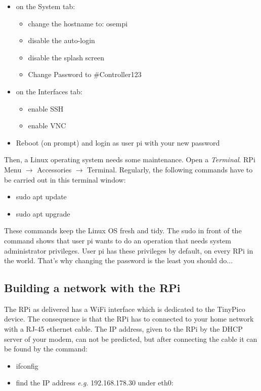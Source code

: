 \begin{itemize}
	\item on the \textsf{System} tab:
	\begin{itemize}
		\item change the hostname to: \textsf{osempi}
		\item disable the auto-login
		\item disable the splash screen
		\item Change Password to \textsf{\#Controller123}
	\end{itemize}
	\item on the \textsf{Interfaces} tab:
		\begin{itemize}
		\item enable SSH
		\item enable VNC
	\end{itemize}
    \item Reboot (on prompt) and login as user \textsf{pi} with your new password
\end{itemize}

Then, a Linux operating system needs some maintenance. Open a \textit{Terminal}. \textsf{RPi Menu $\rightarrow$ Accessories $\rightarrow$ Terminal}. Regularly, the following commands have to be carried out in this terminal window:
\begin{itemize}
	\item \textsf{sudo apt update}
	\item \textsf{sudo apt upgrade}
\end{itemize}

These commands keep the Linux OS fresh and tidy. The \textsf{sudo} in front of the command shows that user \textsf{pi} wants to do an operation that needs system administrator privileges. User \textsf{pi} has these privileges by default, on every RPi in the world. That's why changing the password is the least you should do...

\subsection{Building a network with the RPi}

The RPi as delivered has a WiFi interface which is dedicated to the TinyPico device. The consequence is that the RPi has to connected to your home network with a RJ-45 ethernet cable. The IP address, given to the RPi by the DHCP server of your modem, can not be predicted, but after connecting the cable it can be found by the command:
\begin{itemize}
	\item \textsf{ifconfig}
	\item find the IP address \emph{e.g.} 192.168.178.30 under \textsf{eth0:}
\end{itemize}

